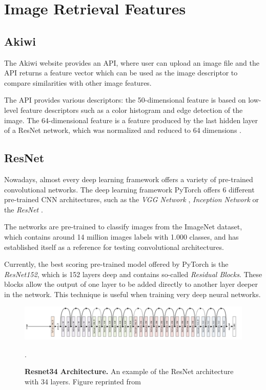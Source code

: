 \documentclass[12pt]{report}
\begin{document}
\pagebreak
\section{Image Retrieval Features}

\subsection{Akiwi}
The Akiwi website \cite{sonnenberg_akiwi_nodate} provides an API, where user can upload an image file and the API returns a feature vector which can be used as the image descriptor to compare similarities with other image features.

The API provides various descriptors: the 50-dimensional feature is based on low-level feature descriptors such as a color histogram and edge detection of the image. The 64-dimensional feature is a feature produced by the last hidden layer of a ResNet network, which was normalized and reduced to 64 dimensions \cite{Barthel:2017:VBM:3078971.3079016}.


\subsection{ResNet}
Nowadays, almost every deep learning framework offers a variety of pre-trained convolutional networks. The deep learning framework PyTorch offers 6 different pre-trained CNN architectures, such as the \textit{VGG Network} \cite{simonyan_very_2014}, \textit{Inception Network} \cite{szegedy_rethinking_2015} or the \textit{ResNet} \cite{he_deep_2015}. 

The networks are pre-trained to classify images from the ImageNet dataset, which contains around 14 million images labels with 1.000 classes, and has established itself as a reference for testing convolutional architectures. 

Currently, the best scoring pre-trained model offered by PyTorch is the \textit{ResNet152}, which is 152 layers deep and contains so-called \textit{Residual Blocks}. These blocks allow the output of one layer to be added directly to another layer deeper in the network. This technique is useful when training very deep neural networks.

\begin{figure}[h]
\centering
{\includegraphics[width=\linewidth]{02_background/CBIR/resnet_arch}}
\caption{\label{fig:resnet34} \textbf{Resnet34 Architecture.} An example of the ResNet architecture with 34 layers. Figure reprinted from \cite{noauthor_resnet-152_nodate}}.
\end{figure}
\end{document}
